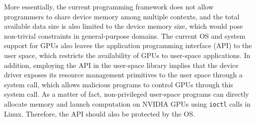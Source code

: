 More essentially, the current programming framework does not allow
programmers to share device memory among multiple contexts, and the
total available data size is also limited to the device memory size,
which would pose non-trivial constraints in general-purpose domains.
The current OS and system support for GPUs also leaves the
application programming interface (API) to the user space, which
restricts the availability of GPUs to user-space applications.
In addition, employing the API in the user-space library implies that
the device driver exposes its resource management primitives to the user
space through a system call, which allows malicious programs to control
GPUs through this system call. 
As a matter of fact, non-privileged user-space programs can directly
allocate memory and launch computation on NVIDIA GPUs using
\texttt{ioctl} calls in Linux.
Therefore, the API should also be protected by the OS.


